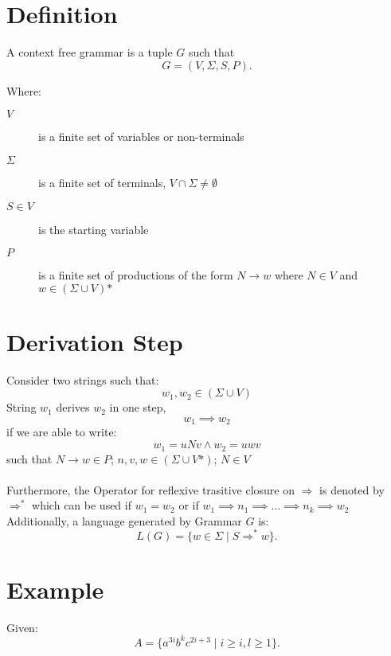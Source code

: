 \documentclass[12pt]{book}
\title{\coursetitle\linebreak\lecturename}
\author{\\Cain Susko\\ 
           \\ \\ \\
      Queen's University 
    \\School of Computing\\}
\begin{document}
\begin{titlepage}
        \maketitle
\end{titlepage}


\section*{Definition}
A context free grammar is a tuple $G$ such that
\[
G=\left( V, \Sigma, S, P \right) 
.\] 

Where:
\begin{description}
        \item[$V$] is a finite set of variables or non-terminals
        \item [$\Sigma$] is a finite set of terminals, $V\cap\Sigma\neq\emptyset$
        \item[$S\in V$] is the starting variable
        \item[$P$] is a finite set of productions of the form  $N\to w$ where  $N\in V$ and  $w\in \left( \Sigma\cup V \right)\text{*} $
\end{description}

\section*{Derivation Step}
Consider two strings such that:
\[w_1, w_2 \in (\Sigma\cup V)\]
String $w_1$ derives $w_2$ in one step,
\[w_1\implies w_2\]
if we are able to write:
\[w_1=uNv\wedge w_2=uwv\]
such that $N\to w\in P$;   $n,v,w \in (\Sigma\cup V\text{*})$;   $N\in V$ 
\paragraph{}
Furthermore, the Operator for reflexive trasitive closure on $\Rightarrow$ is denoted by  $\Rightarrow^*$ which can be used if $w_1=w_2$ 
      or if $w_1\implies n_1\implies\ldots\implies n_k\implies w_2$\\
Additionally, a language generated by Grammar $G$ is:
 \[
L(G) = \{w\in\Sigma  \mid S\Rightarrow^*w\}
.\] 
\pagebreak

\section*{Example}
Given:
\[
        A = \{a^{3i}b^k c^{2i+3}  \mid i \geq i, l\geq 1\}
.\] 
\end{document}
